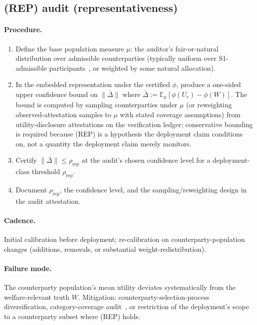 \subsection{(REP) audit (representativeness)}

\paragraph{Procedure.}
\begin{enumerate}
\item Define the base population measure $\mu$: the auditor's
  fair-or-natural distribution over admissible counterparties
  (typically uniform over S1-admissible
  participants~\citep{lasser2026paper8a}, or weighted by some
  natural allocation).
\item In the embedded representation under the certified $\phi$,
  produce a one-sided upper confidence bound on $\|\bar\Delta\|$
  where $\bar\Delta := \mathbb{E}_\mu[\phi(U_c) - \phi(W)]$. The
  bound is computed by sampling counterparties under $\mu$ (or
  reweighting observed-attestation samples to $\mu$ with stated
  coverage assumptions) from utility-disclosure attestations on
  the verification ledger; conservative bounding is required
  because (REP) is a hypothesis the deployment claim conditions
  on, not a quantity the deployment claim merely monitors.
\item Certify $\|\bar\Delta\| \leq \rho_\mathrm{rep}$ at the
  audit's chosen confidence level for a deployment-class threshold
  $\rho_\mathrm{rep}$.
\item Document $\rho_\mathrm{rep}$, the confidence level, and the
  sampling/reweighting design in the audit attestation.
\end{enumerate}

\paragraph{Cadence.} Initial calibration before deployment;
re-calibration on counterparty-population changes (additions,
removals, or substantial weight-redistribution).

\paragraph{Failure mode.} The counterparty population's mean
utility deviates systematically from the welfare-relevant truth
$W$. Mitigation: counterparty-selection-process diversification,
category-coverage audit~\citep[Audit
3]{lasser2026paper10}, or restriction of the deployment's scope
to a counterparty subset where (REP) holds.

